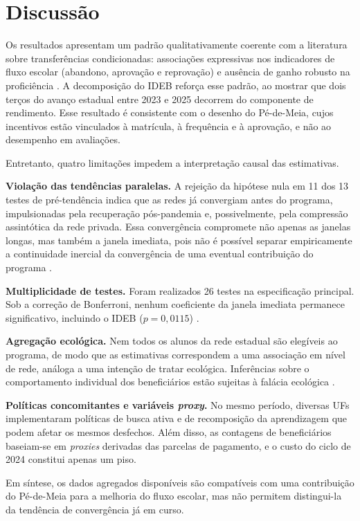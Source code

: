 \section{Discussão}
\label{sec_discussao}

Os resultados apresentam um padrão qualitativamente coerente com a literatura sobre transferências condicionadas: associações expressivas nos indicadores de fluxo escolar (abandono, aprovação e reprovação) e ausência de ganho robusto na proficiência \cite{Fiszbein2009,Glewwe2012}.
A decomposição do IDEB reforça esse padrão, ao mostrar que dois terços do avanço estadual entre 2023 e 2025 decorrem do componente de rendimento.
Esse resultado é consistente com o desenho do Pé-de-Meia, cujos incentivos estão vinculados à matrícula, à frequência e à aprovação, e não ao desempenho em avaliações.

Entretanto, quatro limitações impedem a interpretação causal das estimativas.

\textbf{Violação das tendências paralelas.}
A rejeição da hipótese nula em 11 dos 13 testes de pré-tendência indica que as redes já convergiam antes do programa, impulsionadas pela recuperação pós-pandemia e, possivelmente, pela compressão assintótica da rede privada.
Essa convergência compromete não apenas as janelas longas, mas também a janela imediata, pois não é possível separar empiricamente a continuidade inercial da convergência de uma eventual contribuição do programa \cite{Roth2023}.

\textbf{Multiplicidade de testes.}
Foram realizados 26 testes na especificação principal.
Sob a correção de Bonferroni, nenhum coeficiente da janela imediata permanece significativo, incluindo o IDEB ($p = 0{,}0115$) \cite{Dunn1961}.

\textbf{Agregação ecológica.}
Nem todos os alunos da rede estadual são elegíveis ao programa, de modo que as estimativas correspondem a uma associação em nível de rede, análoga a uma intenção de tratar ecológica.
Inferências sobre o comportamento individual dos beneficiários estão sujeitas à falácia ecológica \cite{Robinson1950}.

\textbf{Políticas concomitantes e variáveis \textit{proxy}.}
No mesmo período, diversas UFs implementaram políticas de busca ativa e de recomposição da aprendizagem que podem afetar os mesmos desfechos.
Além disso, as contagens de beneficiários baseiam-se em \textit{proxies} derivadas das parcelas de pagamento, e o custo do ciclo de 2024 constitui apenas um piso.

Em síntese, os dados agregados disponíveis são compatíveis com uma contribuição do Pé-de-Meia para a melhoria do fluxo escolar, mas não permitem distingui-la da tendência de convergência já em curso.
